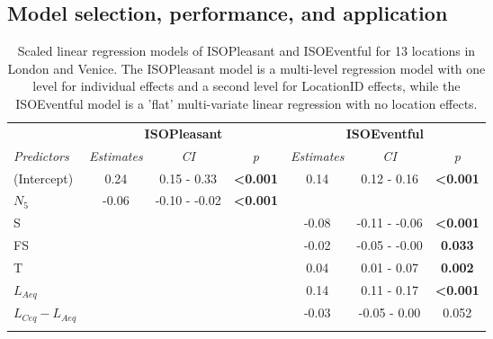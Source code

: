 \subsection{Model selection, performance, and application}
\begin{table}[ht]
\centering
\caption{Scaled linear regression models of ISOPleasant and ISOEventful for 13 locations in London and Venice. The ISOPleasant model is a multi-level regression model with one level for individual effects and a second level for LocationID effects, while the ISOEventful model is a 'flat' multi-variate linear regression with no location effects.}
\label{tab:model}

\def\arraystretch{.5}
\begin{tabular}{@{}l|lccccc@{}}
\toprule
\multicolumn{1}{l|}{} &
  \multicolumn{3}{c}{\textbf{ISOPleasant}} &
  \multicolumn{3}{c}{\textbf{ISOEventful}} \\
\textit{Predictors} &
  \multicolumn{1}{c}{\textit{Estimates}} &
  \textit{CI} &
  \textit{p} &
  \textit{Estimates} &
  \textit{CI} &
  \textit{p} \\ \midrule
(Intercept) &
  \multicolumn{1}{c}{0.24} &
  0.15 - 0.33 &
  \textbf{\textless{}0.001} &
  0.14 &
  0.12 - 0.16 &
  \textbf{\textless{}0.001} \\
$N_5$             & \multicolumn{1}{c}{-0.06} & -0.10 - -0.02 & \textbf{\textless{}0.001} &       &               &                           \\
S                 & \multicolumn{1}{c}{}      &               &                           & -0.08 & -0.11 - -0.06 & \textbf{\textless{}0.001} \\
FS                & \multicolumn{1}{c}{}      &               &                           & -0.02 & -0.05 - -0.00 & \textbf{0.033}            \\
T                 & \multicolumn{1}{c}{}      &               &                           & 0.04  & 0.01 - 0.07   & \textbf{0.002}            \\
$L_{Aeq}$         & \multicolumn{1}{c}{}      &               &                           & 0.14  & 0.11 - 0.17   & \textbf{\textless{}0.001} \\
$L_{Ceq}-L_{Aeq}$ & \multicolumn{1}{c}{}      &               &                           & -0.03 & -0.05 - 0.00  & 0.052                     \\
\\

\end{tabular}
\end{table}
